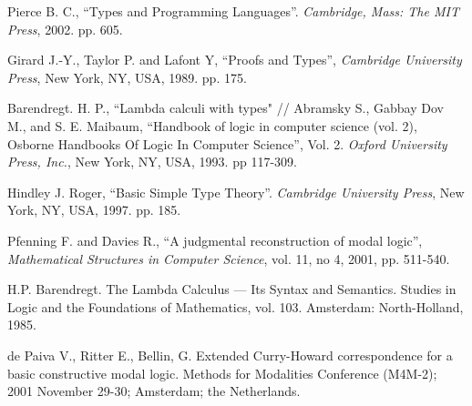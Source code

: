 \documentclass[a4paper]{article}
\begin{document}
\begin{thebibliography}{}
   Pierce B. C., ``Types and Programming Languages''. \textit{Cambridge, Mass: The MIT
  Press}, 2002. pp. 605. \parskip=1mm

   Girard J.-Y., Taylor P. and  Lafont Y, ``Proofs and Types'', \textit{Cambridge University
  Press}, New York, NY, USA, 1989. pp. 175. \parskip=1mm

   Barendregt. H. P., ``Lambda calculi with types" // Abramsky S., Gabbay Dov M., and S. E.
  Maibaum, ``Handbook of logic in computer science (vol. 2), Osborne Handbooks Of Logic In Computer
  Science'', Vol. 2. \textit{Oxford University Press, Inc.}, New York, NY, USA, 1993. pp 117-309.
  \parskip=1mm

   Hindley J. Roger, ``Basic Simple Type Theory''. \textit{Cambridge University Press}, New
  York, NY, USA, 1997. pp. 185. \parskip=1mm

   Pfenning F. and Davies R., ``A judgmental reconstruction of modal logic'',
  \textit{Mathematical Structures in Computer Science}, vol. 11, no 4, 2001, pp. 511-540. \parskip=1mm

   H.P. Barendregt. The Lambda Calculus --- Its Syntax and Semantics. Studies in Logic and
  the Foundations of Mathematics, vol. 103. Amsterdam: North-Holland, 1985.

   de Paiva V., Ritter E., Bellin, G. Extended Curry-Howard correspondence for a basic constructive modal logic. Methods for Modalities Conference (M4M-2); 2001 November 29-30; Amsterdam; the Netherlands.
\end{thebibliography}
\end{document}
